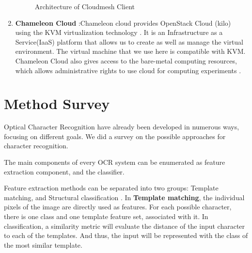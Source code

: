 \documentclass[9pt,twocolumn,twoside]{../../styles/osajnl}
\begin{document}
\begin{enumerate}
\begin{figure}
\centering
{}
\caption{Architecture of Cloudmesh Client \cite{cloudmesh}}
\label{Architecture of Cloudmesh Client}
\end{figure}

\item{\bfseries Chameleon Cloud} :Chameleon cloud provides
  OpenStack Cloud (kilo) using the KVM virtualization
  technology \cite{www-chameleon-openstack}. It is an Infrastructure as
  a Service(IaaS) platform that allows us to create as well as manage
  the virtual environment. The virtual machine that we use here is
  compatible with KVM. Chameleon Cloud also gives access to the
  bare-metal computing resources, which allows administrative rights to
  use cloud for computing experiments \cite{www-chameleon-baremetal}.
\end{enumerate}


\section{Method Survey}

Optical Character Recognition have already been developed in numerous
ways, focusing on different goals. We did a survey on the possible
approaches for character recognition.

The main components of every OCR system can be enumerated as feature
extraction component, and the classifier.

Feature extraction methods can be separated into two groups:
Template matching, and Structural classification \cite{borovikov2014survey}.
In \textbf{Template matching}, the individual pixels of the image
are directly used as features. For each possible character, there is 
one class and one template feature set, associated with it. In classification,
a similarity metric will evaluate the distance of the input character to each
of the templates. And thus, the input will be represented with the class of
the most similar template.
\end{document}

